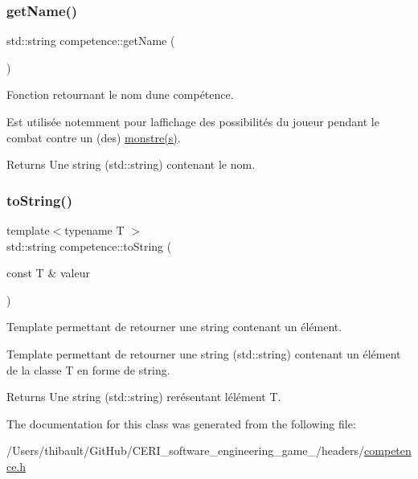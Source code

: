 \subsubsection{\texorpdfstring{get\+Name()}{getName()}}
{\footnotesize\ttfamily std\+::string competence\+::get\+Name (\begin{DoxyParamCaption}{ }\end{DoxyParamCaption})}



Fonction retournant le nom d\textquotesingle{}une compétence. 

Est utilisée notemment pour l\textquotesingle{}affichage des possibilités du joueur pendant le combat contre un (des) \hyperlink{classmonstre}{monstre(s)}. \begin{DoxyReturn}{Returns}
Une string ({\ttfamily std\+::string}) contenant le nom. 
\end{DoxyReturn}
\mbox{\label{classcompetence_adbd67d184b75c46bc22c1aef070d9246}} 
\subsubsection{\texorpdfstring{to\+String()}{toString()}}
{\footnotesize\ttfamily template$<$typename T $>$ \\
std\+::string competence\+::to\+String (\begin{DoxyParamCaption}\item[{const T \&}]{valeur }\end{DoxyParamCaption})}



Template permettant de retourner une string contenant un élément. 

Template permettant de retourner une string ({\ttfamily std\+::string}) contenant un élément de la classe {\ttfamily T} en forme de string. \begin{DoxyReturn}{Returns}
Une string ({\ttfamily std\+::string}) rerésentant l\textquotesingle{}élément {\ttfamily T}. 
\end{DoxyReturn}


The documentation for this class was generated from the following file\+:\begin{DoxyCompactItemize}
\item 
/\+Users/thibault/\+Git\+Hub/\+C\+E\+R\+I\+\_\+software\+\_\+engineering\+\_\+game\+\_/headers/\hyperlink{competence_8h}{competence.\+h}\end{DoxyCompactItemize}
